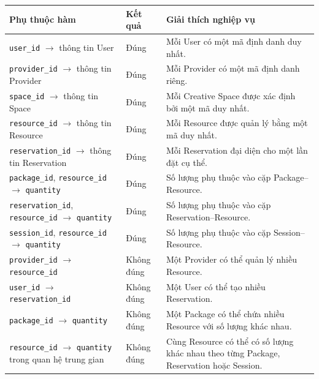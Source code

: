 \begin{center}
\scriptsize
\begin{tabular}{p{.30\linewidth} p{.28\linewidth} p{.25\linewidth}}
\toprule
Phụ thuộc hàm & Kết quả & Giải thích nghiệp vụ \\
\midrule

\texttt{user\_id} $\rightarrow$ thông tin User &
Đúng &
Mỗi User có một mã định danh duy nhất. \\

\texttt{provider\_id} $\rightarrow$ thông tin Provider &
Đúng &
Mỗi Provider có một mã định danh riêng. \\

\texttt{space\_id} $\rightarrow$ thông tin Space &
Đúng &
Mỗi Creative Space được xác định bởi một mã duy nhất. \\

\texttt{resource\_id} $\rightarrow$ thông tin Resource &
Đúng &
Mỗi Resource được quản lý bằng một mã duy nhất. \\

\texttt{reservation\_id} $\rightarrow$ thông tin Reservation &
Đúng &
Mỗi Reservation đại diện cho một lần đặt cụ thể. \\

{\texttt{package\_id}, \texttt{resource\_id}} $\rightarrow$ \texttt{quantity} &
Đúng &
Số lượng phụ thuộc vào cặp Package--Resource. \\

{\texttt{reservation\_id}, \texttt{resource\_id}} $\rightarrow$ \texttt{quantity} &
Đúng &
Số lượng phụ thuộc vào cặp Reservation--Resource. \\

{\texttt{session\_id}, \texttt{resource\_id}} $\rightarrow$ \texttt{quantity} &
Đúng &
Số lượng phụ thuộc vào cặp Session--Resource. \\

\texttt{provider\_id} $\rightarrow$ \texttt{resource\_id} &
Không đúng &
Một Provider có thể quản lý nhiều Resource. \\

\texttt{user\_id} $\rightarrow$ \texttt{reservation\_id} &
Không đúng &
Một User có thể tạo nhiều Reservation. \\

\texttt{package\_id} $\rightarrow$ \texttt{quantity} &
Không đúng &
Một Package có thể chứa nhiều Resource với số lượng khác nhau. \\

\texttt{resource\_id} $\rightarrow$ \texttt{quantity} trong quan hệ trung gian &
Không đúng &
Cùng Resource có thể có số lượng khác nhau theo từng Package, Reservation hoặc Session. \\

\bottomrule
\end{tabular}
\end{center}

